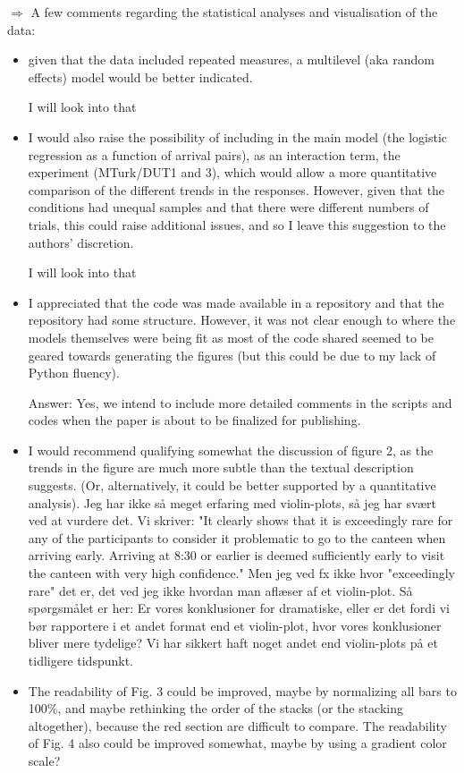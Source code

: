 \documentclass[a4paper]{article}
\newenvironment{robin}{\smallskip \noindent \color{red!10!green!50!blue}}{\color{black}\smallskip}
\newenvironment{tobo}{\smallskip \noindent \color{yellow!80!black!80}}{\color{black}\smallskip}
\begin{document}
$\Rightarrow$ A few comments regarding the statistical analyses and visualisation of the data:
\begin{itemize}
\item given that the data included repeated measures, a multilevel (aka random effects) model would be better indicated. 

\begin{robin} I will look into that \end{robin}
\item I would also raise the possibility of including in the main model (the logistic regression as a function of arrival pairs), as an interaction term, the experiment (MTurk/DUT1 and 3), which would allow a more quantitative comparison of the different trends in the responses. However, given that the conditions had unequal samples and that there were different numbers of trials, this could raise additional issues, and so I leave this suggestion to the authors' discretion. 

\begin{robin} I will look into that \end{robin}
\item I appreciated that the code was made available in a repository and that the repository had some structure. However, it was not clear enough to where the models themselves were being fit as most of the code shared seemed to be geared towards generating the figures (but this could be due to my lack of Python fluency). 

\begin{robin}Answer: Yes, we intend to include more detailed comments in the scripts and codes when the paper is about to be finalized for publishing. \end{robin}
\item I would recommend qualifying somewhat the discussion of figure 2, as the trends in the figure are much more subtle than the textual description suggests. (Or, alternatively, it could be better supported by a quantitative analysis).
\begin{tobo}
Jeg har ikke så meget erfaring med violin-plots, så jeg har svært ved at vurdere det. Vi skriver: "It clearly shows that it is exceedingly rare for any of the participants to consider it problematic to go to the canteen when arriving early. Arriving at 8:30 or earlier is deemed sufficiently early to visit the canteen with very high confidence." Men jeg ved fx ikke hvor "exceedingly rare" det er, det ved jeg ikke hvordan man aflæser af et violin-plot. Så spørgsmålet er her: Er vores konklusioner for dramatiske, eller er det fordi vi bør rapportere i et andet format end et violin-plot, hvor vores konklusioner bliver mere tydelige? Vi har sikkert haft noget andet end violin-plots på et tidligere tidspunkt.
\end{tobo}
\item The readability of Fig. 3 could be improved, maybe by normalizing all bars to 100\%, and maybe rethinking the order of the stacks (or the stacking altogether), because the red section are difficult to compare. The readability of Fig. 4 also could be improved somewhat, maybe by using a gradient color scale?


\end{itemize}
\end{document}
